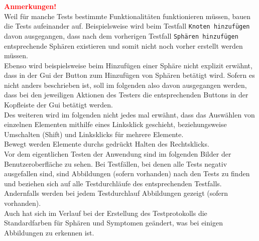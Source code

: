 \documentclass[enabledeprecatedfontcommands]{scrartcl}
\begin{document}
	
\newpage
\textbf{\textcolor{red}{Anmerkungen!}}\\
Weil für manche Tests bestimmte Funktionalitäten funktionieren müssen, bauen die Tests aufeinander auf. Beispielsweise wird beim Testfall \texttt{Knoten hinzufügen} davon ausgegangen, dass nach dem vorherigen Testfall \texttt{Sphären hinzufügen} entsprechende Sphären existieren und somit nicht noch vorher erstellt werden müssen. \\
Ebenso wird beispielsweise beim Hinzufügen einer Sphäre nicht explizit erwähnt, dass in der Gui der Button zum Hinzufügen von Sphären betätigt wird. Sofern es nicht anders beschrieben ist, soll im folgenden also davon ausgegangen werden, dass bei den jeweiligen Aktionen des Testers die entsprechenden Buttons in der Kopfleiste der Gui betätigt werden. \\
Des weiteren wird im folgenden nicht jedes mal erwähnt, dass das Auswählen von einzelnen Elementen mithilfe eines Linksklick geschieht, beziehungsweise Umschalten (Shift) und Linksklicks für mehrere Elemente. \\
Bewegt werden Elemente durchs gedrückt Halten des Rechtsklicks. \\
Vor dem eigentlichen Testen der Anwendung sind im folgenden Bilder der Benutzeroberfläche zu sehen. Bei Testfällen, bei denen alle Tests negativ ausgefallen sind, sind Abbildungen (sofern vorhanden) nach den Tests zu finden und beziehen sich auf alle Testdurchläufe des entsprechenden Testfalls. Andernfalls werden bei jedem Testdurchlauf Abbildungen gezeigt (sofern vorhanden). \\
Auch hat sich im Verlauf bei der Erstellung des Testprotokolls die Standardfarben für Sphären und Symptomen geändert, was bei einigen Abbildungen zu erkennen ist.  \\

\newpage

\thispagestyle{fancy}
\fancyhead{}

\fancyfoot{}
\renewcommand{\headrulewidth}{0.4pt}
\tableofcontents

\newpage


\end{document}
